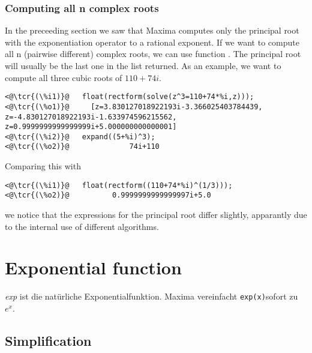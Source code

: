\documentclass[../Maxima_Workbook.tex]{subfiles}
\begin{document}
\subsubsection{Computing all n complex roots}

In the preceeding section we saw that Maxima computes only the principal root with the exponentiation operator to a rational exponent. If we want to compute all n (pairwise different) complex roots, we can use function . The principal root will usually be the last one in the list returned. As an example, we want to compute all three cubic roots of $ 110+74i $.

\lz \begin{small}
\color{blue} \leqn
\begin{lstlisting}
<@\tcr{(\%i1)}@   float(rectform(solve(z^3=110+74*%i,z)));
<@\tcr{(\%o1)}@     [z=3.830127018922193i-3.366025403784439, z=-4.830127018922193i-1.633974596215562, z=0.9999999999999999i+5.000000000000001]
<@\tcr{(\%i2)}@   expand((5+%i)^3);
<@\tcr{(\%o2)}@			     74i+110
\end{lstlisting}
\color{black} \reqn
\end{small}

\lz Comparing this with

\lz \begin{small}
\color{blue}
\begin{lstlisting}
<@\tcr{(\%i1)}@   float(rectform((110+74*%i)^(1/3)));
<@\tcr{(\%o2)}@		     0.9999999999999997i+5.0
\end{lstlisting}
\color{black}
\end{small}

\lz we notice that the expressions for the principal root differ slightly, apparantly due to the internal use of different algorithms.

\section{Exponential function}

\lz {} \hfill \tcr{[function]}

\lz \emph{exp} ist die natürliche Exponentialfunktion. Maxima vereinfacht \verb|exp(x)|sofort zu $ e^x $.

\subsection{Simplification}
\end{document}
